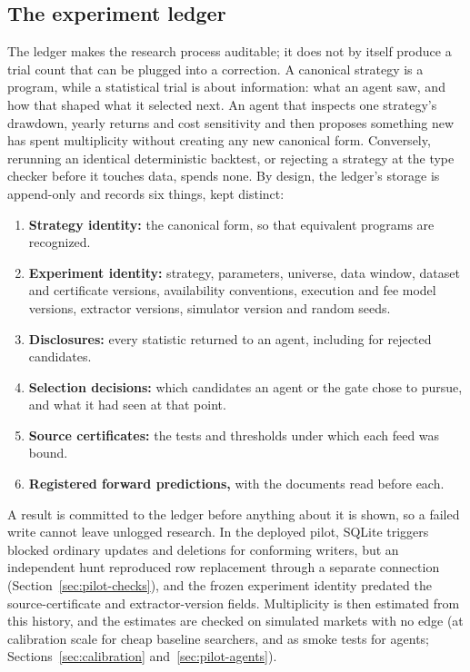 \documentclass[11pt]{article}
\begin{document}
\subsection{The experiment ledger}\label{sec:ledger}

The ledger makes the research process auditable; it does not by itself produce a trial count that can be plugged into a correction. A canonical strategy is a program, while a statistical trial is about information: what an agent saw, and how that shaped what it selected next. An agent that inspects one strategy's drawdown, yearly returns and cost sensitivity and then proposes something new has spent multiplicity without creating any new canonical form. Conversely, rerunning an identical deterministic backtest, or rejecting a strategy at the type checker before it touches data, spends none. By design, the ledger's storage is append-only and records six things, kept distinct:
\begin{enumerate}
  \item \textbf{Strategy identity:} the canonical form, so that equivalent programs are recognized.
  \item \textbf{Experiment identity:} strategy, parameters, universe, data window, dataset and certificate versions, availability conventions, execution and fee model versions, extractor versions, simulator version and random seeds.
  \item \textbf{Disclosures:} every statistic returned to an agent, including for rejected candidates.
  \item \textbf{Selection decisions:} which candidates an agent or the gate chose to pursue, and what it had seen at that point.
  \item \textbf{Source certificates:} the tests and thresholds under which each feed was bound.
  \item \textbf{Registered forward predictions,} with the documents read before each.
\end{enumerate}
A result is committed to the ledger before anything about it is shown, so a failed write cannot leave unlogged research. In the deployed pilot, SQLite triggers blocked ordinary updates and deletions for conforming writers, but an independent hunt reproduced row replacement through a separate connection (Section~\ref{sec:pilot-checks}), and the frozen experiment identity predated the source-certificate and extractor-version fields. Multiplicity is then estimated from this history, and the estimates are checked on simulated markets with no edge (at calibration scale for cheap baseline searchers, and as smoke tests for agents; Sections~\ref{sec:calibration} and~\ref{sec:pilot-agents}).
\end{document}
